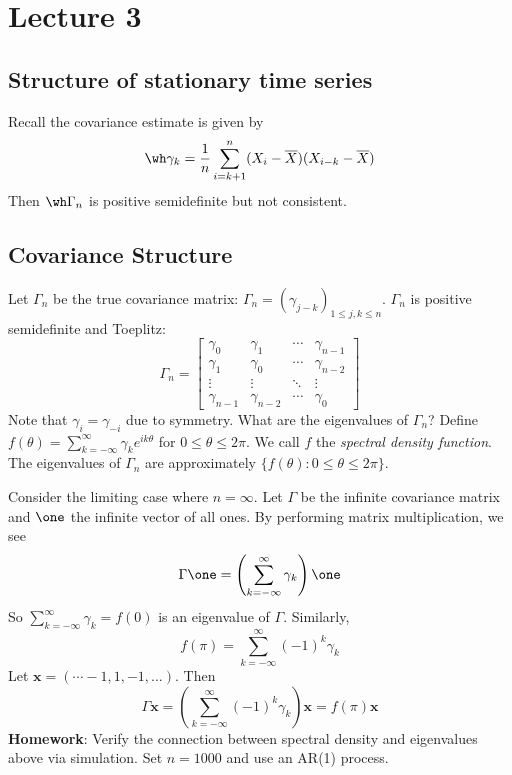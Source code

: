 \section{Lecture 3}

\subsection*{Structure of stationary time series}
Recall the covariance estimate is given by
\[\wh\gamma_k = \frac{1}{n}\sum_{i=k+1}^n (X_i - \overline{X})(X_{i-k} - \overline{X})\]
Then \(\wh \Gamma_n\) is positive semidefinite but not consistent.

\subsection*{Covariance Structure}
Let \(\Gamma_n\) be the true covariance matrix: \(\Gamma_n = (\gamma_{j-k})_{1 \leq j, k \leq n}\). \(\Gamma_n\) is positive semidefinite and Toeplitz:
\[\Gamma_n = 
\begin{bmatrix}
\gamma_0 & \gamma_1 & \cdots & \gamma_{n-1} \\
\gamma_1 & \gamma_0 & \cdots & \gamma_{n-2} \\
\vdots & \vdots & \ddots & \vdots \\
\gamma_{n-1} & \gamma_{n-2} & \cdots & \gamma_0
\end{bmatrix}\]
Note that \(\gamma_i = \gamma_{-i}\) due to symmetry. What are the eigenvalues of \(\Gamma_n\)? Define \(f(\theta) = \sum_{k=-\infty}^\infty \gamma_k e^{ik\theta}\) for \(0 \leq \theta \leq 2\pi\). We call \(f\) the \emph{spectral density function}. The eigenvalues of \(\Gamma_n\) are approximately \(\{ f(\theta) : 0 \leq \theta \leq 2\pi \}\).

Consider the limiting case where \(n = \infty\). Let \(\Gamma\) be the infinite covariance matrix and \(\one\) the infinite vector of all ones. By performing matrix multiplication, we see
\[\Gamma \one = \left(\sum_{k=-\infty}^\infty \gamma_k\right) \one\]
So \(\sum_{k=-\infty}^\infty \gamma_k = f(0)\) is an eigenvalue of \(\Gamma\). Similarly,
\[f(\pi) = \sum_{k=-\infty}^\infty (-1)^k \gamma_k\]
Let \(\mathbf{x} = (\cdots -1, 1, -1, \dots)\). Then
\[\Gamma \mathbf{x} = \left(\sum_{k=-\infty}^\infty (-1)^k \gamma_k\right) \mathbf{x} = f(\pi)\mathbf{x}\]
\textbf{Homework}: Verify the connection between spectral density and eigenvalues above via simulation. Set \(n = 1000\) and use an AR(1) process.

